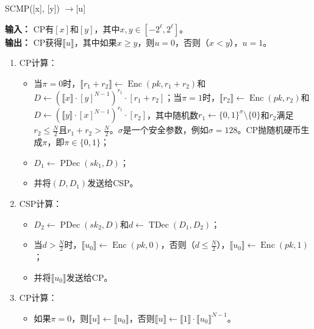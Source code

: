 \begin{algorithm}
\caption{SCMP([x], [y]) \(\rightarrow\)[u]}
\textbf{输入：} CP有\([x]\)和\([y]\)，其中\(x, y\in[-2^{\ell}, 2^{\ell}]\)。\\
\textbf{输出：} CP获得\(\llbracket u\rrbracket\)，其中如果\(x\geq y\)，则\(u=0\)，否则（\(x<y\)），\(u=1\)。
\begin{enumerate}
    \item CP计算：
    \begin{itemize}
        \item 当\(\pi=0\)时，\(\llbracket r_{1}+r_{2}\rrbracket\leftarrow\operatorname{Enc}(pk,r_{1}+r_{2})\)和\(D\leftarrow(\llbracket x\rrbracket\cdot[y]^{N-1})^{r_{1}}\cdot[r_{1}+r_{2}]\)；当\(\pi=1\)时，\(\llbracket r_{2}\rrbracket\leftarrow\operatorname{Enc}(pk,r_{2})\)和\(D\leftarrow(\llbracket y\rrbracket\cdot[x]^{N-1})^{r_{1}}\cdot[r_{2}]\)，其中随机数\(r_{1}\leftarrow\{0,1\}^{\sigma}\setminus\{0\}\)和\(r_{2}\)满足\(r_{2}\leq\frac{N}{2}\)且\(r_{1}+r_{2}>\frac{N}{2}\)。\(\sigma\)是一个安全参数，例如\(\sigma=128\)。CP抛随机硬币生成\(\pi\)，即\(\pi\in\{0,1\}\)；
        \item \(D_{1}\leftarrow\operatorname{PDec}(sk_{1},D)\)；
        \item 并将\((D,D_{1})\)发送给CSP。
    \end{itemize}
    \item CSP计算：
    \begin{itemize}
        \item \(D_{2}\leftarrow\operatorname{PDec}(sk_{2},D)\)和\(d\leftarrow\operatorname{TDec}(D_{1},D_{2})\)；
        \item 当\(d>\frac{N}{2}\)时，\(\llbracket u_{0}\rrbracket\leftarrow\operatorname{Enc}(pk,0)\)，否则（\(d\leq\frac{N}{2}\)），\(\llbracket u_{0}\rrbracket\leftarrow\operatorname{Enc}(pk,1)\)；
        \item 并将\(\llbracket u_{0}\rrbracket\)发送给CP。
    \end{itemize}
    \item CP计算：
    \begin{itemize}
        \item 如果\(\pi=0\)，则\(\llbracket u\rrbracket\leftarrow\llbracket u_{0}\rrbracket\)，否则\(\llbracket u\rrbracket\leftarrow\llbracket 1\rrbracket\cdot\llbracket u_{0}\rrbracket^{N-1}\)。
    \end{itemize}
\end{enumerate}
\end{algorithm}

